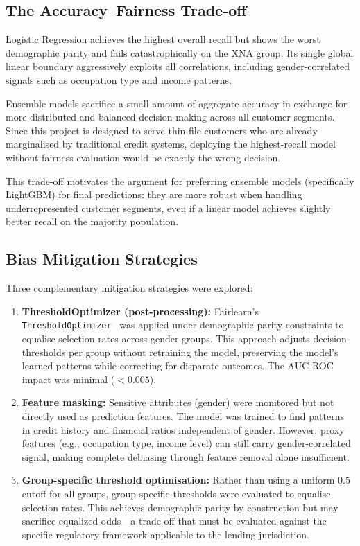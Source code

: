 \subsection{The Accuracy--Fairness Trade-off}

Logistic Regression achieves the highest overall recall but shows the worst demographic parity and fails catastrophically on the XNA group. Its single global linear boundary aggressively exploits all correlations, including gender-correlated signals such as occupation type and income patterns.

Ensemble models sacrifice a small amount of aggregate accuracy in exchange for more distributed and balanced decision-making across all customer segments. Since this project is designed to serve thin-file customers who are already marginalised by traditional credit systems, deploying the highest-recall model without fairness evaluation would be exactly the wrong decision.

This trade-off motivates the argument for preferring ensemble models (specifically LightGBM) for final predictions: they are more robust when handling underrepresented customer segments, even if a linear model achieves slightly better recall on the majority population.

\subsection{Bias Mitigation Strategies}

Three complementary mitigation strategies were explored:

\begin{enumerate}
    \item \textbf{ThresholdOptimizer (post-processing):} Fairlearn's \texttt{ThresholdOptimizer}~\cite{bird2020} was applied under demographic parity constraints to equalise selection rates across gender groups. This approach adjusts decision thresholds per group without retraining the model, preserving the model's learned patterns while correcting for disparate outcomes. The AUC-ROC impact was minimal ($< 0.005$).

    \item \textbf{Feature masking:} Sensitive attributes (gender) were monitored but not directly used as prediction features. The model was trained to find patterns in credit history and financial ratios independent of gender. However, proxy features (e.g., occupation type, income level) can still carry gender-correlated signal, making complete debiasing through feature removal alone insufficient.

    \item \textbf{Group-specific threshold optimisation:} Rather than using a uniform 0.5 cutoff for all groups, group-specific thresholds were evaluated to equalise selection rates. This achieves demographic parity by construction but may sacrifice equalized odds---a trade-off that must be evaluated against the specific regulatory framework applicable to the lending jurisdiction.
\end{enumerate}


